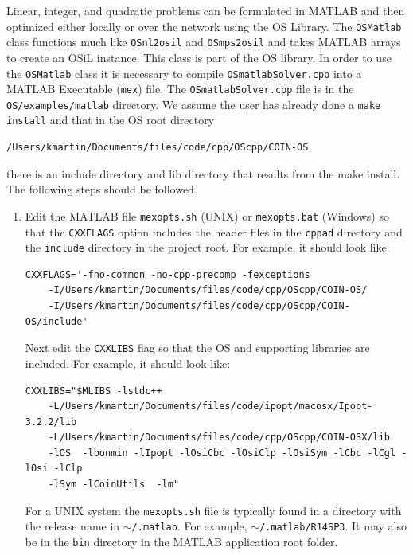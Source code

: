 \documentclass[11pt]{article}
\renewcommand{\_}{{\char"5F}}
\renewcommand{\{}{{\char"7B}}
\renewcommand{\}}{{\char"7D}}
\renewcommand{\^}{{\char"0D}}
\renewcommand{\'}{{\char"0D}}
\begin{document}
\begin{enumerate}[Step 1:]
Linear, integer, and quadratic problems can be formulated in MATLAB and then optimized
either locally or over the network using the OS Library. The {\tt OSMatlab} class functions much like
{\tt OSnl2osil} and {\tt OSmps2osil}
and takes MATLAB arrays to create an OSiL instance.  This class is part of the OS library.
In order to use the {\tt OSMatlab} class it is necessary to  compile
{\tt OSmatlabSolver.cpp}  into  a MATLAB Executable ({\tt mex}) file.
The {\tt OSmatlabSolver.cpp} file is in the {\tt  OS/examples/matlab} directory.
We  assume the user has already done a {\tt make install} and that in the OS root directory
\begin{verbatim}
/Users/kmartin/Documents/files/code/cpp/OScpp/COIN-OS
\end{verbatim}
there is an include directory and lib directory that results from the make install.  The following steps should be followed.


\begin{enumerate}[{\bf Step 1:}]



\item{} Edit the MATLAB file {\tt mexopts.sh} (UNIX) or {\tt mexopts.bat}  (Windows) so that the {\tt CXXFLAGS} option includes the header files in the {\tt cppad} directory and the {\tt include} directory in the project root. For example, it  should look like:
\begin{verbatim}
CXXFLAGS='-fno-common -no-cpp-precomp -fexceptions
    -I/Users/kmartin/Documents/files/code/cpp/OScpp/COIN-OS/
    -I/Users/kmartin/Documents/files/code/cpp/OScpp/COIN-OS/include'
\end{verbatim}

Next edit the {\tt CXXLIBS} flag so that the OS and supporting libraries are included. For example, it should look like:

\begin{verbatim}
CXXLIBS="$MLIBS -lstdc++
    -L/Users/kmartin/Documents/files/code/ipopt/macosx/Ipopt-3.2.2/lib
    -L/Users/kmartin/Documents/files/code/cpp/OScpp/COIN-OSX/lib
    -lOS  -lbonmin -lIpopt -lOsiCbc -lOsiClp -lOsiSym -lCbc -lCgl -lOsi -lClp
    -lSym -lCoinUtils  -lm"
\end{verbatim}

For a UNIX system the {\tt mexopts.sh} file  is typically  found in a directory with the release name in 
{\tt  $\sim$/.matlab}. For example, {\tt $\sim$/.matlab/R14SP3}.  It may also be in the {\tt bin} directory 
in the MATLAB application root folder.



\end{enumerate}
\end{enumerate}
\end{document}

